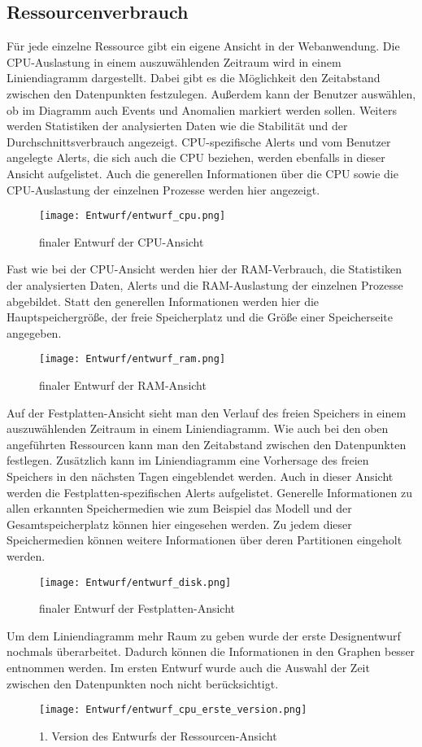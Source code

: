 \documentclass{report}
\begin{document}
\subsection{Ressourcenverbrauch}
Für jede einzelne Ressource gibt ein eigene Ansicht in der Webanwendung.
Die CPU-Auslastung in einem auszuwählenden Zeitraum wird in einem Liniendiagramm dargestellt. Dabei gibt es die Möglichkeit den Zeitabstand zwischen den Datenpunkten festzulegen. Außerdem kann der Benutzer auswählen, ob im Diagramm auch Events und Anomalien markiert werden sollen.
Weiters werden Statistiken der analysierten Daten wie die Stabilität und der Durchschnittsverbrauch angezeigt.
CPU-spezifische Alerts und vom Benutzer angelegte Alerts, die sich auch die CPU beziehen, werden ebenfalls in dieser Ansicht aufgelistet.
Auch die generellen Informationen über die CPU sowie die CPU-Auslastung der einzelnen Prozesse werden hier angezeigt.
\begin{figure}[H]
    \centering
    \texttt{[image: Entwurf/entwurf\_cpu.png]}
    \caption{finaler Entwurf der CPU-Ansicht}
\end{figure}
Fast wie bei der CPU-Ansicht werden hier der RAM-Verbrauch, die Statistiken der analysierten Daten, Alerts und die RAM-Auslastung der einzelnen Prozesse abgebildet. Statt den generellen Informationen werden hier die Hauptspeichergröße, der freie Speicherplatz und die Größe einer Speicherseite angegeben.
\begin{figure}[H]
    \centering
    \texttt{[image: Entwurf/entwurf\_ram.png]}
    \caption{finaler Entwurf der RAM-Ansicht}
\end{figure}
Auf der Festplatten-Ansicht sieht man den Verlauf des freien Speichers in einem auszuwählenden Zeitraum in einem Liniendiagramm. Wie auch bei den oben angeführten Ressourcen kann man den Zeitabstand zwischen den Datenpunkten festlegen. Zusätzlich kann im Liniendiagramm eine Vorhersage des freien Speichers in den nächsten Tagen eingeblendet werden.
Auch in dieser Ansicht werden die Festplatten-spezifischen Alerts aufgelistet. Generelle Informationen zu allen erkannten Speichermedien wie zum Beispiel das Modell und der Gesamtspeicherplatz können hier eingesehen werden. Zu jedem dieser Speichermedien können weitere Informationen über deren Partitionen eingeholt werden.
\begin{figure}[H]
    \centering
    \texttt{[image: Entwurf/entwurf\_disk.png]}
    \caption{finaler Entwurf der Festplatten-Ansicht}
\end{figure}
Um dem Liniendiagramm mehr Raum zu geben wurde der erste Designentwurf nochmals überarbeitet. Dadurch können die Informationen in den Graphen besser entnommen werden. Im ersten Entwurf wurde auch die Auswahl der Zeit zwischen den Datenpunkten noch nicht berücksichtigt.
\begin{figure}[H]
    \centering
    \texttt{[image: Entwurf/entwurf\_cpu\_erste\_version.png]}
    \caption{1. Version des Entwurfs der Ressourcen-Ansicht}
\end{figure}
\end{document}
